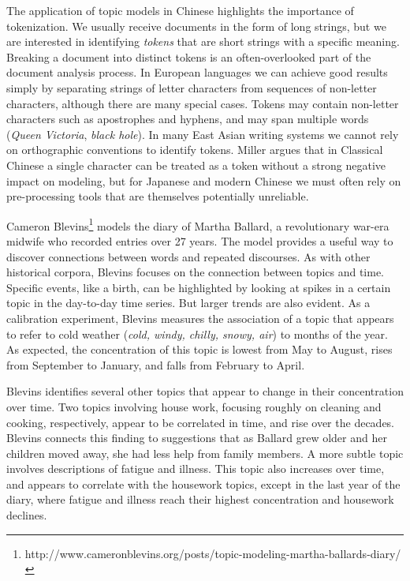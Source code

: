 The application of topic models in Chinese highlights the importance of tokenization.
We usually receive documents in the form of long strings, but we are interested in identifying {\em tokens} that are short strings with a specific meaning.
Breaking a document into distinct tokens is an often-overlooked part of the document analysis process.
In European languages we can achieve good results simply by separating strings of letter characters from sequences of non-letter characters, although there are many special cases.
Tokens may contain non-letter characters such as apostrophes and hyphens, and may span multiple words ({\em Queen Victoria}, {\em black hole}).
In many East Asian writing systems we cannot rely on orthographic conventions to identify tokens.
Miller argues that in Classical Chinese a single character can be treated as a token without a strong negative impact on modeling, but for Japanese and modern Chinese we must often rely on pre-processing tools that are themselves potentially unreliable.


Cameron Blevins\footnote{http://www.cameronblevins.org/posts/topic-modeling-martha-ballards-diary/} models the diary of Martha Ballard, a revolutionary war-era midwife who recorded entries over 27 years. The model provides a useful way to discover connections between words and repeated discourses.
As with other historical corpora, Blevins focuses on the connection between topics and time.
Specific events, like a birth, can be highlighted by looking at spikes in a certain topic in the day-to-day time series.
But larger trends are also evident.
As a calibration experiment, Blevins measures the association of a topic that appears to refer to cold weather ({\em cold, windy, chilly, snowy, air}) to months of the year.
As expected, the concentration of this topic is lowest from May to August, rises from September to January, and falls from February to April.

Blevins identifies several other topics that appear to change in their concentration over time.
Two topics involving house work, focusing roughly on cleaning and cooking, respectively, appear to be correlated in time, and rise over the decades.
Blevins connects this finding to suggestions that as Ballard grew older and her children moved away, she had less help from family members.
A more subtle topic involves descriptions of fatigue and illness.
This topic also increases over time, and appears to correlate with the housework topics, except in the last year of the diary, where fatigue and illness reach their highest concentration and housework declines.

